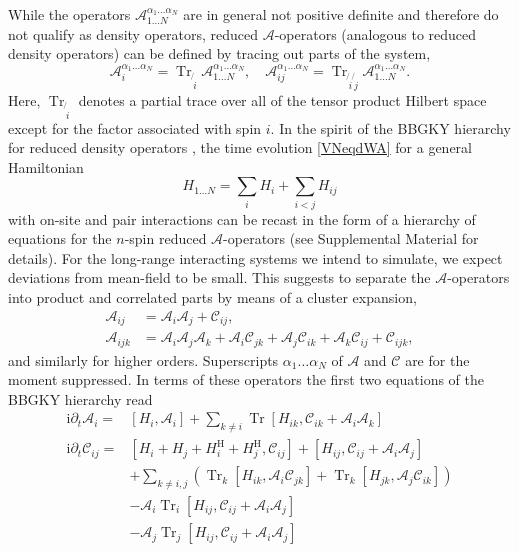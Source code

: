 \documentclass[aps,prl,showpacs,amsmath,amssymb,superscriptaddress,reprint,10pt]{revtex4-1}
\newcommand\ii{{\mathrm{i}}}
\newcommand{\Com}[2]{\left[{#1},{#2}\right]}
\DeclareMathOperator{\Tr}{{Tr}}
\begin{document}
While the operators $\mathscr{A}_{1\dotsc N}^{\alpha_1\dotsc\alpha_N}$ are in general not positive definite and therefore do not qualify as density operators, reduced $\mathscr{A}$-operators (analogous to reduced density operators) can be defined by tracing out parts of the system,
\begin{equation}
\mathscr{A}_i^{\alpha_1\dotsc\alpha_N}=\Tr_{\not{\,i}} \mathscr{A}_{1\dotsc N}^{\alpha_1\dotsc\alpha_N},\quad \mathscr{A}_{ij}^{\alpha_1\dotsc\alpha_N}=\Tr_{\not{\,i}\not{\,j}} \mathscr{A}_{1\dotsc N}^{\alpha_1\dotsc\alpha_N}.
\end{equation}
Here, $\Tr_{\not{\,i}}$ denotes a partial trace over all of the tensor product Hilbert space except for the factor associated with spin $i$. In the spirit of the BBGKY hierarchy for reduced density operators \cite{Bonitz}, the time evolution \eqref{VNeqdWA} for a general Hamiltonian
\begin{equation}\label{e:Hgen}
H_{1\dotsc N} = \sum_i H_i + \sum_{i<j}H_{ij}
\end{equation}
with on-site and pair interactions can be recast in the form of a hierarchy of equations for the $n$-spin reduced $\mathscr{A}$-operators (see Supplemental Material for details). For the long-range interacting systems we intend to simulate, we expect deviations from mean-field to be small. This suggests to separate the $\mathscr{A}$-operators into product and correlated parts by means of a cluster expansion,
\begin{subequations}
\begin{align}
\mathscr{A}_{ij}&=\mathscr{A}_i \mathscr{A}_j+\mathscr{C}_{ij},\label{e:cluster1}\\
\mathscr{A}_{ijk}&=\mathscr{A}_i \mathscr{A}_j \mathscr{A}_k + \mathscr{A}_i \mathscr{C}_{jk} + \mathscr{A}_j \mathscr{C}_{ik} + \mathscr{A}_k \mathscr{C}_{ij} + \mathscr{C}_{ijk},\label{e:cluster2}
\end{align}
\end{subequations}
and similarly for higher orders. Superscripts $\alpha_1\dotsc\alpha_N$ of $\mathscr{A}$ and $\mathscr{C}$ are for the moment suppressed. In terms of these operators the first two equations of the BBGKY hierarchy read
\begin{subequations}
\begin{align}
\ii\partial_t \mathscr{A}_i=&\Com{H_i}{\mathscr{A}_i}+\sum_{k\neq i}\Tr\Com{H_{ik}}{\mathscr{C}_{ik}+\mathscr{A}_i \mathscr{A}_k}\label{e:1st_order}\\
\ii\partial_t \mathscr{C}_{ij}=&\Com{H_i+H_j+H_i^\text{H}+H_j^\text{H}}{\mathscr{C}_{ij}}+\Com{H_{ij}}{\mathscr{C}_{ij}+\mathscr{A}_i \mathscr{A}_j}\nonumber\\
&+\sum_{k\neq i,j}\left(\Tr_k\Com{H_{ik}}{\mathscr{A}_i \mathscr{C}_{jk}}+\Tr_k\Com{H_{jk}}{\mathscr{A}_j \mathscr{C}_{ik}}\right)\nonumber\\
&-\mathscr{A}_i\Tr_i\Com{H_{ij}}{\mathscr{C}_{ij}+\mathscr{A}_i \mathscr{A}_j}\nonumber\\
&-\mathscr{A}_j\Tr_j\Com{H_{ij}}{\mathscr{C}_{ij}+\mathscr{A}_i \mathscr{A}_j}\label{e:2nd_order}
\end{align}
\end{subequations}
\end{document}
